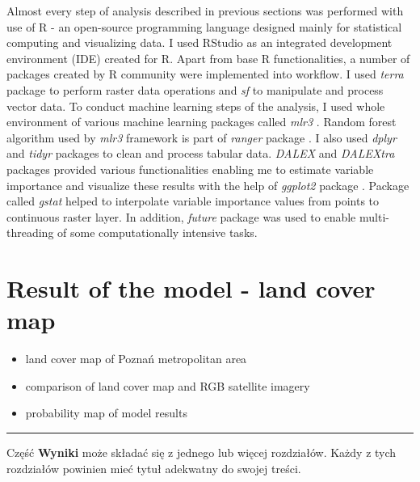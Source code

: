 \documentclass{amuthesis}
\begin{document}
Almost every step of analysis described in previous sections was
performed with use of R \autocite{R-base} - an open-source programming
language designed mainly for statistical computing and visualizing data.
I used RStudio \autocite{rstudio_team_rstudio_2020} as an integrated
development environment (IDE) created for R. Apart from base R
functionalities, a number of packages created by R community were
implemented into workflow. I used \emph{terra} package
\autocite{R-terra} to perform raster data operations and \emph{sf}
\autocite{R-sf} to manipulate and process vector data. To conduct
machine learning steps of the analysis, I used whole environment of
various machine learning packages called \emph{mlr3} \autocite{R-mlr3}.
Random forest algorithm used by \emph{mlr3} framework is part of
\emph{ranger} package \autocite{R-ranger}. I also used \emph{dplyr}
\autocite{R-dplyr} and \emph{tidyr} packages \autocite{R-tidyr} to clean
and process tabular data. \emph{DALEX} \autocite{R-DALEX} and
\emph{DALEXtra} \autocite{R-DALEXtra} packages provided various
functionalities enabling me to estimate variable importance and
visualize these results with the help of \emph{ggplot2} package
\autocite{R-ggplot2}. Package called \emph{gstat} \autocite{R-gstat}
helped to interpolate variable importance values from points to
continuous raster layer. In addition, \emph{future} package
\autocite{R-future} was used to enable multi-threading of some
computationally intensive tasks.


\hypertarget{sec-results-map}{%
\chapter{Result of the model - land cover map}\label{sec-results-map}}

\begin{itemize}
\item
  land cover map of Poznań metropolitan area
\item
  comparison of land cover map and RGB satellite imagery
\item
  probability map of model results
\end{itemize}

\begin{center}\rule{0.5\linewidth}{0.5pt}\end{center}

Część \textbf{Wyniki} może składać się z jednego lub więcej rozdziałów.
Każdy z tych rozdziałów powinien mieć tytuł adekwatny do swojej treści.
\end{document}
